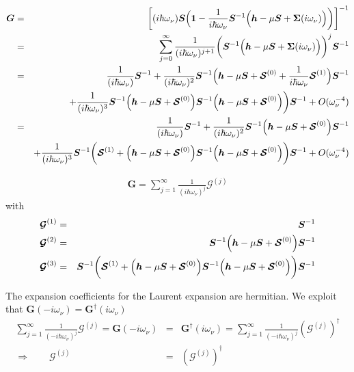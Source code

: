 \documentclass[11pt,a4paper]{report}
\newcommand{\mat}[1]{\bm{#1}}  %
\begin{document}
\begin{eqnarray}
\mat{G}
&=&\biggl[(i\hbar\omega_\nu)\mat{S}
\Bigl(\mat{1}-\frac{1}{i\hbar\omega_\nu}
\mat{S}^{-1}
\Bigl(\mat{h}-\mu\mat{S}+\mat{\Sigma}(i\omega_\nu)\Bigr)\biggr)\biggr]^{-1}
\nonumber\\
&=&
\sum_{j=0}^\infty
\frac{1}{(i\hbar\omega_\nu)^{j+1}}
\biggl(
\mat{S}^{-1}\Bigl(\mat{h}-\mu\mat{S}+\mat{\Sigma}(i\omega_\nu)\Bigr)\biggr)^{j}
\mat{S}^{-1}
\nonumber\\
&=&
\frac{1}{(i\hbar\omega_\nu)}
\mat{S}^{-1}
+
\frac{1}{(i\hbar\omega_\nu)^2}
\mat{S}^{-1}\Bigl(\mat{h}-\mu\mat{S}
+\mat{\mathcal{S}}^{(0)}
+\frac{1}{i\hbar\omega_\nu}\mat{\mathcal{S}}^{(1)}
\Bigr)\mat{S}^{-1}
\nonumber\\
&&+
\frac{1}{(i\hbar\omega_\nu)^3}
\mat{S}^{-1}\Bigl(\mat{h}-\mu\mat{S}+\mat{\mathcal{S}}^{(0)}\Bigr)
\mat{S}^{-1}
\Bigl(\mat{h}-\mu\mat{S}+\mat{\mathcal{S}}^{(0)}\Bigr)\biggr)\mat{S}^{-1}
+O(\omega_\nu^{-4})
\nonumber\\
&=&
\frac{1}{(i\hbar\omega_\nu)}
\mat{S}^{-1}
+
\frac{1}{(i\hbar\omega_\nu)^2}
\mat{S}^{-1}\Bigl(\mat{h}-\mu\mat{S}
+\mat{\mathcal{S}}^{(0)}
\Bigr)\mat{S}^{-1}
\nonumber\\
&&+
\frac{1}{(i\hbar\omega_\nu)^3}
\mat{S}^{-1}
\biggl(
\mat{\mathcal{S}}^{(1)}
+
\Bigl(\mat{h}-\mu\mat{S}+\mat{\mathcal{S}}^{(0)}\Bigr)\mat{S}^{-1}
\Bigl(\mat{h}-\mu\mat{S}+\mat{\mathcal{S}}^{(0)}\Bigr)
\biggr)
\mat{S}^{-1}
+O(\omega_\nu^{-4})
\end{eqnarray}

\begin{eqnarray}
\mat{G}=\sum_{j=1}^\infty \frac{1}{(i\hbar\omega_\nu)^j}\mat{\mathcal{G}}^{(j)}
\end{eqnarray}
with
\begin{eqnarray}
\mat{\mathcal{G}}^{(1)}
&=&\mat{S}^{-1}
\nonumber\\
\mat{\mathcal{G}}^{(2)}
&=&\mat{S}^{-1}
\Bigl(\mat{h}-\mu\mat{S}
+\mat{\mathcal{S}}^{(0)}
\Bigr)\mat{S}^{-1}
\nonumber\\
\mat{\mathcal{G}}^{(3)}
&=&\mat{S}^{-1}
\biggl(
\mat{\mathcal{S}}^{(1)}
+
\Bigl(\mat{h}-\mu\mat{S}+\mat{\mathcal{S}}^{(0)}\Bigr)\mat{S}^{-1}
\Bigl(\mat{h}-\mu\mat{S}+\mat{\mathcal{S}}^{(0)}\Bigr)
\biggr)
\mat{S}^{-1}
\end{eqnarray}


The expansion coefficients for the Laurent expansion are hermitian.
We exploit that $\mat{G}(-i\omega_\nu)=\mat{G}^\dagger(i\omega_\nu)$
\begin{eqnarray}
\sum_{j=1}^\infty\frac{1}{(-i\hbar\omega_\nu)^j}\mat{\mathcal{G}}^{(j)}
=\mat{G}(-i\omega_\nu)&=&\mat{G}^\dagger(i\omega_\nu)
=\sum_{j=1}^\infty\frac{1}{(-i\hbar\omega_\nu)^j}
\left(\mat{\mathcal{G}}^{(j)}\right)^\dagger
\nonumber\\
\Rightarrow\qquad
\mat{\mathcal{G}}^{(j)}&=&\left(\mat{\mathcal{G}}^{(j)}\right)^\dagger
\end{eqnarray}
\end{document}
